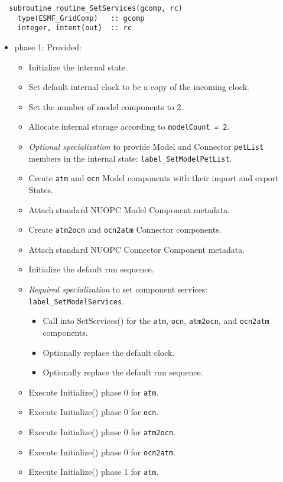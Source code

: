 \begin{verbatim}  subroutine routine_SetServices(gcomp, rc)
    type(ESMF_GridComp)   :: gcomp
    integer, intent(out)  :: rc
\end{verbatim}

\begin{itemize}
\item phase 1: {\sc Provided:}
  \begin{itemize}
  \item Initialize the internal state.
  \item Set default internal clock to be a copy of the incoming clock.
  \item Set the number of model components to 2.
  \item Allocate internal storage according to {\tt modelCount = 2}.
  \item {\it Optional specialization} to provide Model and Connector {\tt petList} members in the internal state: {\tt label\_SetModelPetList}.
  \item Create {\tt atm} and {\tt ocn} Model components with their import and export States.
  \item Attach standard NUOPC Model Component metadata.
  \item Create {\tt atm2ocn} and {\tt ocn2atm} Connector components.
  \item Attach standard NUOPC Connector Component metadata.
  \item Initialize the default run sequence.
  \item {\it Required specialization} to set component services: {\tt label\_SetModelServices}. 
  \begin{itemize}
    \item Call into SetServices() for the {\tt atm}, {\tt ocn}, {\tt atm2ocn}, and {\tt ocn2atm} components.
    \item Optionally replace the default clock. 
    \item Optionally replace the default run sequence.
  \end{itemize}
  \item Execute Initialize() phase 0 for {\tt atm}.
  \item Execute Initialize() phase 0 for {\tt ocn}.
  \item Execute Initialize() phase 0 for {\tt atm2ocn}.
  \item Execute Initialize() phase 0 for {\tt ocn2atm}.
  \item Execute Initialize() phase 1 for {\tt atm}.

\end{itemize}
\end{itemize}
